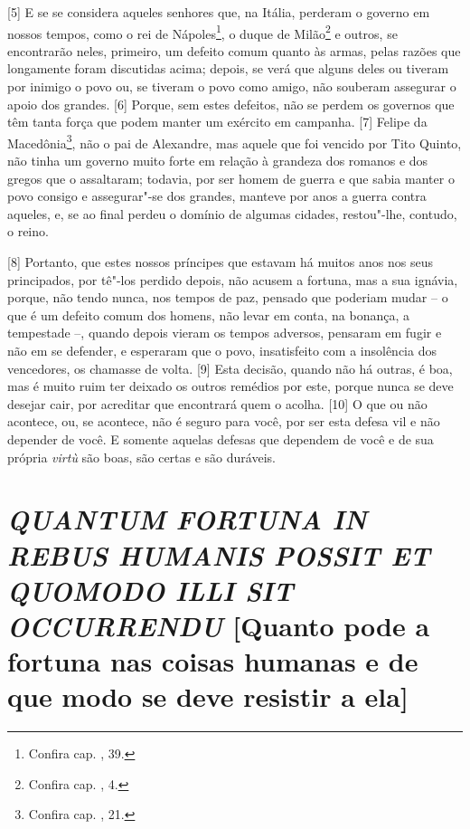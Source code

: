 {[}5{]} E se se considera aqueles senhores que, na Itália, perderam o
governo em nossos tempos, como o rei de Nápoles\footnote{Confira cap.
  , 39.}, o duque de Milão\footnote{Confira cap. , 4.} e outros,
se encontrarão neles, primeiro, um defeito comum quanto às armas, pelas
razões que longamente foram discutidas acima; depois, se verá que alguns
deles ou tiveram por inimigo o povo ou, se tiveram o povo como amigo,
não souberam assegurar o apoio dos grandes. {[}6{]} Porque, sem estes
defeitos, não se perdem os governos que têm tanta força que podem manter
um exército em campanha. {[}7{]} Felipe da Macedônia\footnote{Confira
  cap. , 21.}, não o pai de Alexandre, mas aquele que foi vencido por
Tito Quinto, não tinha um governo muito forte em relação à grandeza dos
romanos e dos gregos que o assaltaram; todavia, por ser homem de guerra
e que sabia manter o povo consigo e assegurar"-se dos grandes, manteve
por anos a guerra contra aqueles, e, se ao final perdeu o domínio de
algumas cidades, restou"-lhe, contudo, o reino.

{[}8{]} Portanto, que estes nossos príncipes que estavam há muitos anos
nos seus principados, por tê"-los perdido depois, não acusem a fortuna,
mas a sua ignávia, porque, não tendo nunca, nos tempos de paz, pensado
que poderiam mudar -- o que é um defeito comum dos homens, não levar em
conta, na bonança, a tempestade --, quando depois vieram os tempos
adversos, pensaram em fugir e não em se defender, e esperaram que o
povo, insatisfeito com a insolência dos vencedores, os chamasse de
volta. {[}9{]} Esta decisão, quando não há outras, é boa, mas é muito
ruim ter deixado os outros remédios por este, porque nunca se deve
desejar cair, por acreditar que encontrará quem o acolha. {[}10{]} O que
ou não acontece, ou, se acontece, não é seguro para você, por ser esta
defesa vil e não depender de você. E somente aquelas defesas que
dependem de você e de sua própria \emph{virtù} são boas, são certas e
são duráveis.

\quebra\section{\emph{QUANTUM FORTUNA IN REBUS HUMANIS POSSIT ET QUOMODO ILLI SIT OCCURRENDU}
{[}Quanto pode a fortuna nas coisas humanas e de que modo se deve resistir a ela{]}}


